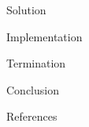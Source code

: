 \documentclass[ignorenonframetext,]{beamer}
\begin{document}
\begin{frame}{%
\protect\hypertarget{solution-2}{%
Solution}}

\end{frame}

\begin{frame}{%
\protect\hypertarget{implementation-2}{%
Implementation}}

\end{frame}

\begin{frame}{%
\protect\hypertarget{termination-2}{%
Termination}}

\end{frame}

\begin{frame}{%
\protect\hypertarget{conclusion-2}{%
Conclusion}}

\end{frame}

\begin{frame}[allowframebreaks]{%
\protect\hypertarget{references}{%
References}}

\end{frame}
\end{document}
